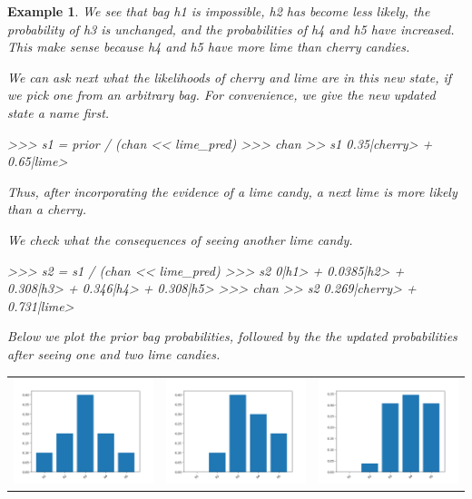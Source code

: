 \documentclass[leqno]{tufte-book} %
\newtheorem{example}[theorem]{Example}
\begin{document}
\begin{example}
\noindent We see that bag h1 is impossible, h2 has become less likely,
the probability of h3 is unchanged, and the probabilities of h4 and h5
have increased. This make sense because h4 and h5 have more lime than
cherry candies.

We can ask next what the likelihoods of cherry and lime are in this
new state, if we pick one from an arbitrary bag. For convenience, we
give the new updated state a name first.
\begin{python}
>>> s1 = prior / (chan << lime_pred)
>>> chan >> s1
0.35|cherry> + 0.65|lime>
\end{python}

\noindent Thus, after incorporating the evidence of a lime candy, a
next lime is more likely than a cherry.

We check what the consequences of seeing another lime candy.
\begin{python}
>>> s2 = s1 / (chan << lime_pred)
>>> s2
0|h1> + 0.0385|h2> + 0.308|h3> + 0.346|h4> + 0.308|h5>
>>> chan >> s2 
0.269|cherry> + 0.731|lime>
\end{python}

\noindent Below we plot the prior bag probabilities, followed by the
the updated probabilities after seeing one and two lime candies.
\begin{center}
\begin{tabular}{ccc}
\includegraphics[width=14em]{Pictures/candybag1.png} 
&
\includegraphics[width=14em]{Pictures/candybag2.png} 
&
\includegraphics[width=14em]{Pictures/candybag3.png} 
\end{tabular}
\end{center}
\end{example}
\end{document}
